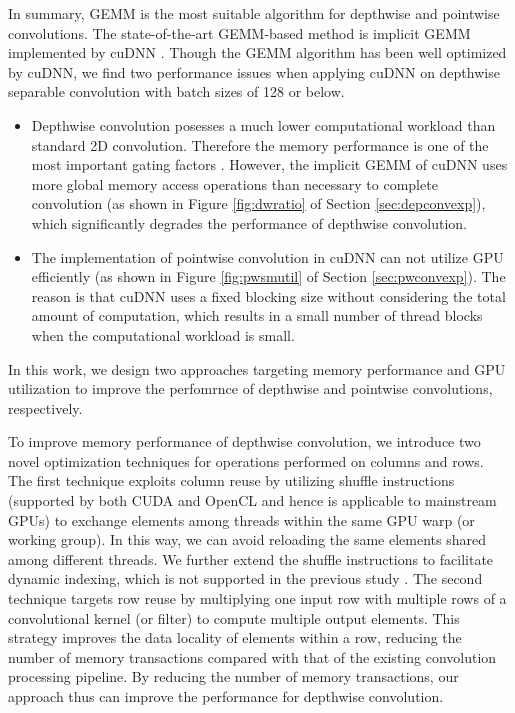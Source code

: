 In summary, GEMM is the most suitable algorithm for depthwise and pointwise convolutions.
The state-of-the-art GEMM-based method is implicit GEMM implemented by cuDNN \cite{ChetlurWVCTCS14}.
Though the GEMM algorithm has been well optimized by cuDNN, we find two performance issues when applying cuDNN on depthwise separable convolution with batch sizes of 128 or below.
\begin{itemize}
    \item Depthwise convolution posesses a much lower computational workload than standard 2D convolution. Therefore the memory performance is one of the most important gating factors \cite{cudaperformance}. 
    However, the implicit GEMM of cuDNN uses more global memory access operations than necessary to complete convolution (as shown in Figure \ref{fig:dwratio} of Section \ref{sec:depconvexp}), which significantly degrades the performance of depthwise convolution.
    \item The implementation of pointwise convolution in cuDNN can not utilize GPU efficiently (as shown in Figure \ref{fig:pwsmutil} of Section \ref{sec:pwconvexp}).
    The reason is that cuDNN uses a fixed blocking size without considering the total amount of computation, which results in a small number of thread blocks when the computational workload is small. 
\end{itemize}
In this work, we design two approaches targeting memory performance and GPU utilization to improve the perfomrnce of depthwise and pointwise convolutions, respectively. 

To improve memory performance of depthwise convolution, we introduce two novel optimization techniques for operations performed on columns and rows. 
The first technique exploits column reuse by utilizing shuffle instructions (supported by both CUDA and OpenCL and hence is applicable to mainstream GPUs) to exchange elements among threads within the same GPU warp (or working group). 
In this way, we can avoid reloading the same elements shared among different threads. 
We further extend the shuffle instructions to facilitate dynamic indexing, which is not supported in the previous study \cite{vasilache2014fast}. 
The second technique targets row reuse by multiplying one input row with multiple rows of a convolutional kernel (or filter) to compute multiple output elements. 
This strategy improves the data locality of elements within a row, reducing the number of memory transactions compared with that of the existing convolution processing pipeline. 
By reducing the number of memory transactions, our approach thus can improve the performance for depthwise convolution.

